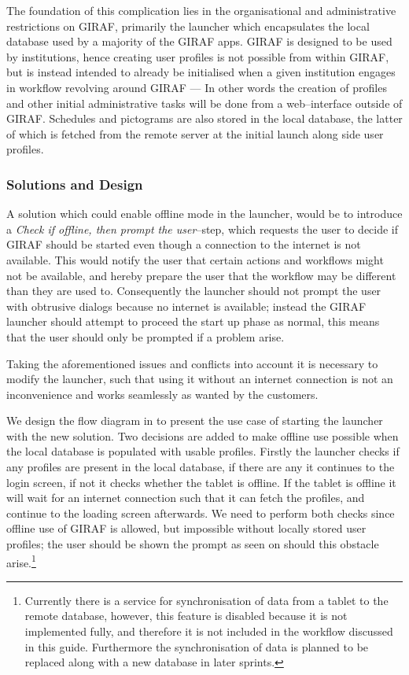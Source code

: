 The foundation of this complication lies in the organisational and administrative restrictions on GIRAF, primarily the launcher which encapsulates the local database used by a majority of the GIRAF apps.
GIRAF is designed to be used by institutions, hence creating user profiles is not possible from within GIRAF, but is instead intended to already be initialised when a given institution engages in workflow revolving around GIRAF --- In other words the creation of profiles and other initial administrative tasks will be done from a web--interface outside of GIRAF.
Schedules and pictograms are also stored in the local database, the latter of which is fetched from the remote server at the initial launch along side user profiles.

\subsubsection{Solutions and Design}
A solution which could enable offline mode in the launcher, would be to introduce a \textit{Check if offline, then prompt the user}--step, which requests the user to decide if GIRAF should be started even though a connection to the internet is not available.
This would notify the user that certain actions and workflows might not be available, and hereby prepare the user that the workflow may be different than they are used to.
Consequently the launcher should not prompt the user with obtrusive dialogs because no internet is available; instead the GIRAF launcher should attempt to proceed the start up phase as normal, this means that the user should only be prompted if a problem arise.

\bigskip
Taking the aforementioned issues and conflicts into account it is necessary to modify the launcher, such that using it without an internet connection is not an inconvenience and works seamlessly as wanted by the customers.

We design the flow diagram in  to present the use case of starting the launcher with the new solution.
Two decisions are added to make offline use possible when the local database is populated with usable profiles.
Firstly the launcher checks if any profiles are present in the local database, if there are any it continues to the login screen, if not it checks whether the tablet is offline.
If the tablet is offline it will wait for an internet connection such that it can fetch the profiles, and continue to the loading screen afterwards.
We need to perform both checks since offline use of GIRAF is allowed, but impossible without locally stored user profiles; the user should be shown the prompt as seen on  should this obstacle arise.\footnote{Currently there is a service for synchronisation of data from a tablet to the remote database, however, this feature is disabled because it is not implemented fully, and therefore it is not included in the workflow discussed in this guide. Furthermore the synchronisation of data is planned to be replaced along with a new database in later sprints.}

